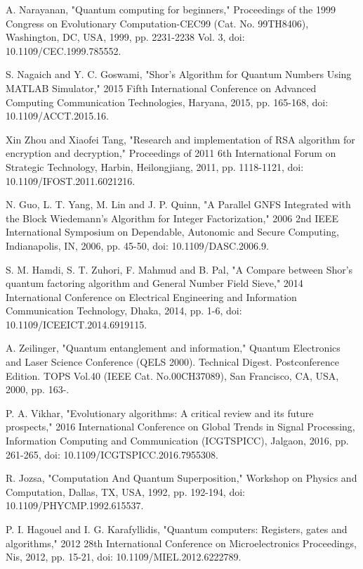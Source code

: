 \documentclass[conference]{IEEEtran}
\begin{document}
\begin{thebibliography}{00}

 A. Narayanan, "Quantum computing for beginners," Proceedings of the 1999 Congress on Evolutionary Computation-CEC99 (Cat. No. 99TH8406), Washington, DC, USA, 1999, pp. 2231-2238 Vol. 3, doi: 10.1109/CEC.1999.785552.

 S. Nagaich and Y. C. Goswami, "Shor's Algorithm for Quantum Numbers Using MATLAB Simulator," 2015 Fifth International Conference on Advanced Computing Communication Technologies, Haryana, 2015, pp. 165-168, doi: 10.1109/ACCT.2015.16.

 Xin Zhou and Xiaofei Tang, "Research and implementation of RSA algorithm for encryption and decryption," Proceedings of 2011 6th International Forum on Strategic Technology, Harbin, Heilongjiang, 2011, pp. 1118-1121, doi: 10.1109/IFOST.2011.6021216.

 N. Guo, L. T. Yang, M. Lin and J. P. Quinn, "A Parallel GNFS Integrated with the Block Wiedemann's Algorithm for Integer Factorization," 2006 2nd IEEE International Symposium on Dependable, Autonomic and Secure Computing, Indianapolis, IN, 2006, pp. 45-50, doi: 10.1109/DASC.2006.9.

 S. M. Hamdi, S. T. Zuhori, F. Mahmud and B. Pal, "A Compare between Shor's quantum factoring algorithm and General Number Field Sieve," 2014 International Conference on Electrical Engineering and Information Communication Technology, Dhaka, 2014, pp. 1-6, doi: 10.1109/ICEEICT.2014.6919115.

 A. Zeilinger, "Quantum entanglement and information," Quantum Electronics and Laser Science Conference (QELS 2000). Technical Digest. Postconference Edition. TOPS Vol.40 (IEEE Cat. No.00CH37089), San Francisco, CA, USA, 2000, pp. 163-.

 P. A. Vikhar, "Evolutionary algorithms: A critical review and its future prospects," 2016 International Conference on Global Trends in Signal Processing, Information Computing and Communication (ICGTSPICC), Jalgaon, 2016, pp. 261-265, doi: 10.1109/ICGTSPICC.2016.7955308.

 R. Jozsa, "Computation And Quantum Superposition," Workshop on Physics and Computation, Dallas, TX, USA, 1992, pp. 192-194, doi: 10.1109/PHYCMP.1992.615537.

 P. I. Hagouel and I. G. Karafyllidis, "Quantum computers: Registers, gates and algorithms," 2012 28th International Conference on Microelectronics Proceedings, Nis, 2012, pp. 15-21, doi: 10.1109/MIEL.2012.6222789.


\end{thebibliography}
\end{document}
